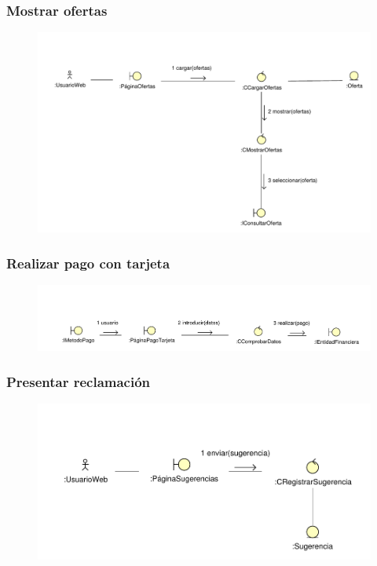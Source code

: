 \documentclass[11pt, a4paper, twoside, titlepage]{article}
\begin{document}
			\subsubsection{Mostrar ofertas}
				\begin{figure}[H]\centering
					\includegraphics[scale=.72]{diagramas/mostrarofertas.pdf}
				\end{figure}

			\subsubsection{Realizar pago con tarjeta}
				\begin{figure}[H]\centering
					\includegraphics[scale=.7]{diagramas/pagotarjeta.pdf}
				\end{figure}

			\subsubsection{Presentar reclamación}
				\begin{figure}[H]\centering
					\includegraphics[scale=.82]{diagramas/presentarreclamacion.pdf}
				\end{figure}
\end{document}
